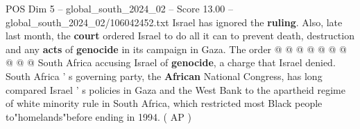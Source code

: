 \begin{textsample}{POS Dim 5 – global\_south\_2024\_02 – Score 13.00 – global\_south\_2024\_02/106042452.txt}
Israel has ignored the \textbf{ruling}.
Also, late last month, the \textbf{court} ordered Israel to do all it can to prevent death, destruction and any \textbf{acts} of \textbf{genocide} in its campaign in Gaza.
The order @ @ @ @ @ @ @ @ @ @ South Africa accusing Israel of \textbf{genocide}, a charge that Israel denied.
South Africa ' s governing party, the \textbf{African} National Congress, has long compared Israel ' s policies in Gaza and the West Bank to the apartheid regime of white minority rule in South Africa, which restricted most Black people to"homelands"before ending in 1994. ( AP )

\end{textsample}
